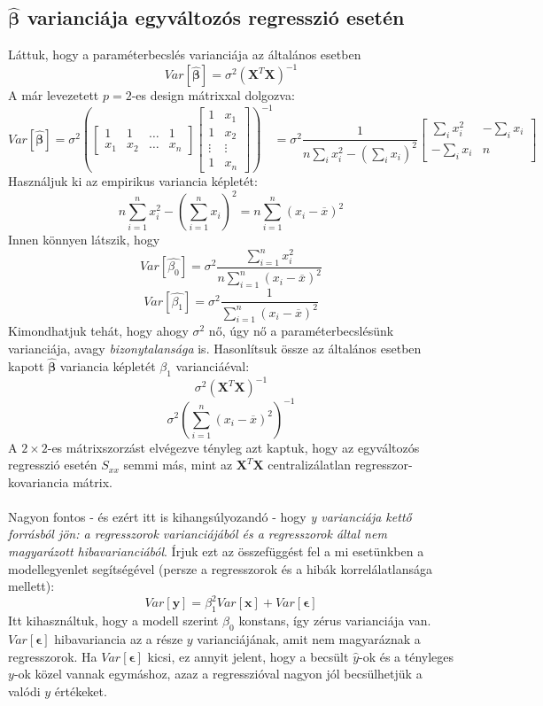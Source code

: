 \documentclass[14p]{report}
\def\pmb{\boldsymbol}
\def\ebeta{\hat{\pmb{\beta}}}
\def\e{\epsilon}
\def\bar{\overline}
\newcounter{x}
\newcounter{y}
\newcounter{z}
\begin{document}
	\subsection{$\ebeta$ varianciája egyváltozós regresszió esetén}
	Láttuk, hogy a paraméterbecslés varianciája az általános esetben
	\[
	Var[\ebeta] = \sigma^2(\pmb{X}^T\pmb{X})^{-1}
	\]
	A már levezetett $p=2$-es design mátrixxal dolgozva:
	\[
	Var[\ebeta] = \sigma^2
	\left(\begin{bmatrix}
		1 & 1 & \dots & 1 \\
		x_1 & x_2 & \dots & x_n
	\end{bmatrix}
	\begin{bmatrix}
		1 & x_1 \\
		1 & x_2 \\
		\vdots & \vdots \\
		1 & x_n
	\end{bmatrix}\right)^{-1}
	=
	\sigma^2
	\frac{1}{n\sum_i{x_i^2} - (\sum_i{x_i})^2}
	\begin{bmatrix}
		\sum_i{x_i^2} & -\sum_i{x_i} \\
		-\sum_i{x_i} & n 
	\end{bmatrix}
	\]
	Használjuk ki az empirikus variancia képletét:
	\[
	n\sum_{i=1}^{n}{x_i^2} - (\sum_{i=1}^{n}{x_i})^2 = n\sum_{i=1}^{n}{(x_i - \bar{x})^2}
	\]
	Innen könnyen látszik, hogy
	\[
	Var[\hat{\beta_0}] = \sigma^2\frac{\sum_{i=1}^{n}{x_i^2}}{n\sum_{i=1}^{n}{(x_i - \bar{x})^2}}
	\]
	\[
	Var[\hat{\beta_1}] = \sigma^2\frac{1}{\sum_{i=1}^{n}{(x_i - \bar{x})^2}}
	\]
	Kimondhatjuk tehát, hogy ahogy $\sigma^2$ nő, úgy nő a paraméterbecslésünk varianciája, avagy \emph{bizonytalansága} is. Hasonlítsuk össze az általános esetben kapott $\ebeta$ variancia képletét $\beta_1$ varianciáéval:
	\[
	\sigma^2(\pmb{X}^T\pmb{X})^{-1}
	\]
	\[
	\sigma^2(\sum_{i=1}^{n}{(x_i - \bar{x})^2})^{-1}
	\]
	A $2 \times 2$-es mátrixszorzást elvégezve tényleg azt kaptuk, hogy az egyváltozós regresszió esetén $S_{xx}$ semmi más, mint az $\pmb{X}^T\pmb{X}$ centralizálatlan regresszor-kovariancia mátrix.
	\\
	\\
	Nagyon fontos - és ezért itt is kihangsúlyozandó - hogy \emph{y varianciája kettő forrásból jön: a regresszorok varianciájából és a regresszorok által nem magyarázott hibavarianciából}. Írjuk ezt az összefüggést fel a mi esetünkben a modellegyenlet segítségével (persze a regresszorok és a hibák korrelálatlansága mellett):
	\[
	Var[\pmb{y}] = \beta_1^2Var[\pmb{x}] + Var[\pmb{\e}] 
	\]
	Itt kihasználtuk, hogy a modell szerint $\beta_0$ konstans, így zérus varianciája van. $Var[\pmb{\e}]$ hibavariancia az a része $y$ varianciájának, amit nem magyaráznak a regresszorok. Ha $Var[\pmb{\e}]$ kicsi, ez annyit jelent, hogy a becsült $\hat{y}$-ok és a tényleges $y$-ok közel vannak egymáshoz, azaz a regresszióval nagyon jól becsülhetjük a valódi $y$ értékeket.
	
\end{document}
